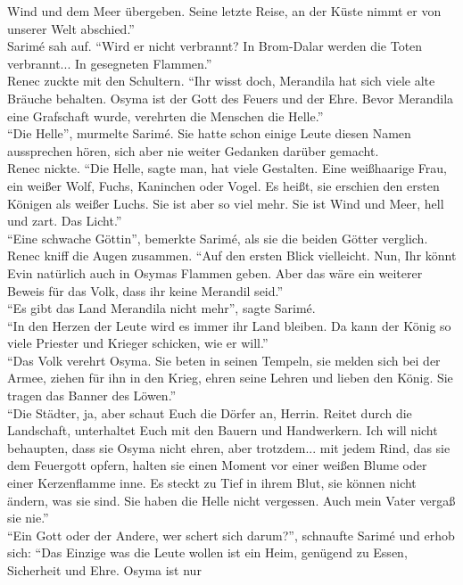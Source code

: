 Wind und dem Meer übergeben. Seine letzte Reise, an der Küste nimmt er von unserer Welt 
abschied.''\\
Sarimé sah auf. ``Wird er nicht verbrannt? In Brom-Dalar werden die Toten verbrannt... In 
gesegneten Flammen.''\\
Renec zuckte mit den Schultern. ``Ihr wisst doch, Merandila hat sich viele alte Bräuche behalten. 
Osyma ist der Gott des Feuers und der Ehre. Bevor Merandila eine Grafschaft wurde, verehrten die 
Menschen die Helle.''\\
``Die Helle'', murmelte Sarimé. Sie hatte schon einige Leute diesen Namen aussprechen hören, sich 
aber nie weiter Gedanken darüber gemacht.\\
Renec nickte. ``Die Helle, sagte man, hat viele Gestalten. Eine weißhaarige Frau, ein weißer Wolf, 
Fuchs, Kaninchen oder Vogel. Es heißt, sie erschien den ersten Königen als weißer Luchs. Sie ist 
aber so viel mehr. Sie ist Wind und Meer, hell und zart. Das Licht.''\\
``Eine schwache Göttin'', bemerkte Sarimé, als sie die beiden Götter verglich. \\
Renec kniff die Augen zusammen. ``Auf den ersten Blick vielleicht. Nun, Ihr könnt Evin natürlich 
auch in Osymas Flammen geben. Aber das wäre ein weiterer Beweis für das Volk, dass ihr keine 
Merandil seid.''\\
``Es gibt das Land Merandila nicht mehr'', sagte Sarimé.\\
``In den Herzen der Leute wird es immer ihr Land bleiben. Da kann der König so viele Priester und 
Krieger schicken, wie er will.''\\
``Das Volk verehrt Osyma. Sie beten in seinen Tempeln, sie melden sich bei der Armee, ziehen für 
ihn in den Krieg, ehren seine Lehren und lieben den König. Sie tragen das Banner des Löwen.''\\
``Die Städter, ja, aber schaut Euch die Dörfer an, Herrin. Reitet durch die Landschaft, unterhaltet 
Euch mit den Bauern und Handwerkern. Ich will nicht behaupten, dass sie Osyma nicht ehren, aber 
trotzdem... mit jedem Rind, das sie dem Feuergott opfern, halten sie einen Moment vor einer weißen 
Blume oder einer Kerzenflamme inne. Es steckt zu Tief in ihrem Blut, sie können nicht ändern, was 
sie sind. Sie haben die Helle nicht vergessen. Auch mein Vater vergaß sie nie.''\\
``Ein Gott oder der Andere, wer schert sich darum?'', schnaufte Sarimé und erhob sich: ``Das 
Einzige was die Leute wollen ist ein Heim, genügend zu Essen, Sicherheit und Ehre. Osyma ist nur 
